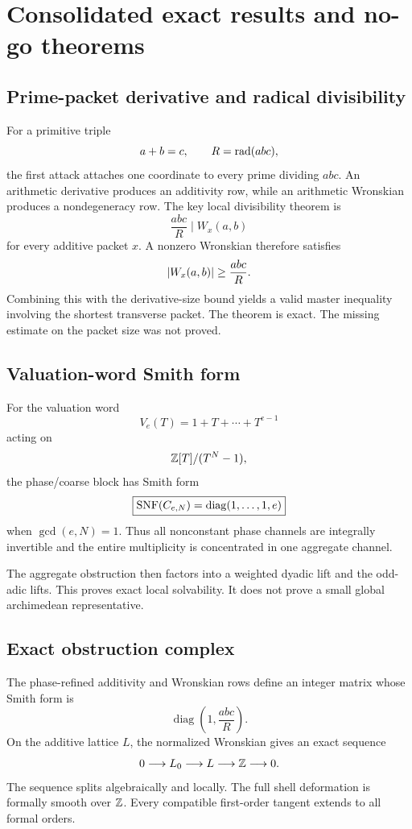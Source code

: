 \chapter{Consolidated exact results and no-go theorems}

\section{Prime-packet derivative and radical divisibility}
For a primitive triple
\[
a+b=c,
\qquad
R=\operatorname{rad}(abc),
\]
the first attack attaches one coordinate to every prime dividing $abc$. An arithmetic derivative produces an additivity row, while an arithmetic Wronskian produces a nondegeneracy row. The key local divisibility theorem is
\[
\boxed{
\frac{abc}{R}
\mid
W_x(a,b)
}
\]
for every additive packet $x$. A nonzero Wronskian therefore satisfies
\[
\left|W_x(a,b)\right|\ge\frac{abc}{R}.
\]
Combining this with the derivative-size bound yields a valid master inequality involving the shortest transverse packet. The theorem is exact. The missing estimate on the packet size was not proved.

\section{Valuation-word Smith form}
For the valuation word
\[
V_e(T)=1+T+\cdots+T^{e-1}
\]
acting on
\[
\mathbb Z[T]/(T^N-1),
\]
the phase/coarse block has Smith form
\[
\boxed{
\operatorname{SNF}(C_{e,N})
=
\operatorname{diag}(1,\ldots,1,e)
}
\]
when $\gcd(e,N)=1$. Thus all nonconstant phase channels are integrally invertible and the entire multiplicity is concentrated in one aggregate channel.

The aggregate obstruction then factors into a weighted dyadic lift and the odd-adic lifts. This proves exact local solvability. It does not prove a small global archimedean representative.

\section{Exact obstruction complex}
The phase-refined additivity and Wronskian rows define an integer matrix whose Smith form is
\[
\boxed{
\operatorname{diag}\left(1,\frac{abc}{R}\right).
}
\]
On the additive lattice $L$, the normalized Wronskian gives an exact sequence
\[
0\longrightarrow L_0
\longrightarrow L
\longrightarrow\mathbb Z
\longrightarrow0.
\]
The sequence splits algebraically and locally. The full shell deformation is formally smooth over $\mathbb Z$. Every compatible first-order tangent extends to all formal orders.


